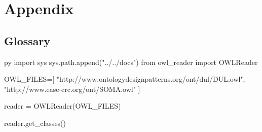\chapter{Appendix}
\label{app:complete_pub_list}
\section{Glossary}
\label{appendix:section1}

\pagestyle{fancy} 

\newcommand{\appendixstyle}[2]{\textbf{#1}\markboth{#1}{#1}\ {#2}}

\begin{pythontexcustomcode}{py}
import sys
sys.path.append("../../docs")
from owl_reader import OWLReader

OWL_FILES=[
    "http://www.ontologydesignpatterns.org/ont/dul/DUL.owl",
    "http://www.ease-crc.org/ont/SOMA.owl"
]

reader = OWLReader(OWL_FILES)
\end{pythontexcustomcode}

\raggedright
\begin{multicols}{2}

\begin{pycode}
reader.get_classes()
\end{pycode}

\end{multicols}
